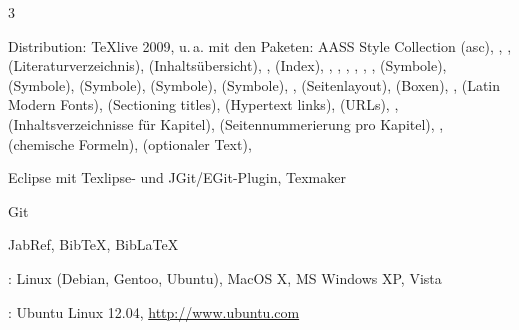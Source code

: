\begin{WidePar}
\begin{multicols}{3}
\begin{description}
  Distribution: \TeX live 2009, u.\,a. mit den Paketen: AASS
  Style Collection (asc),
  ,
  ,
   (Literaturverzeichnis),
   (Inhaltsübersicht),
  ,
   (Index),
  ,
  ,
  ,
  ,
  ,
  ,
   (Symbole),
   (Symbole),
   (Symbole),
   (Symbole),
   (Symbole),
  ,
   (Seitenlayout),
   (Boxen),
  ,
   (Latin Modern Fonts),
   (Sectioning titles),
   (Hypertext links),
   (URLs),
  ,
   (Inhaltsverzeichnisse für Kapitel),
   (Seitennummerierung pro Kapitel),
  , %
   (chemische Formeln),
   (optionaler Text),
  \item[Entwicklungsumgebung] Eclipse mit Texlipse- und JGit/EGit-Plugin,
  Texmaker
  \item[Versionsverwaltung] Git
  \item[Literaturverzeichnis] JabRef, BibTeX, BibLaTeX
  \item[Betriebssysteme] : Linux (Debian, Gentoo, Ubuntu), MacOS X,
  MS Windows XP, Vista
  
  : Ubuntu Linux 12.04,
  \url{http://www.ubuntu.com}
\end{description}


\end{multicols}
\end{WidePar}
